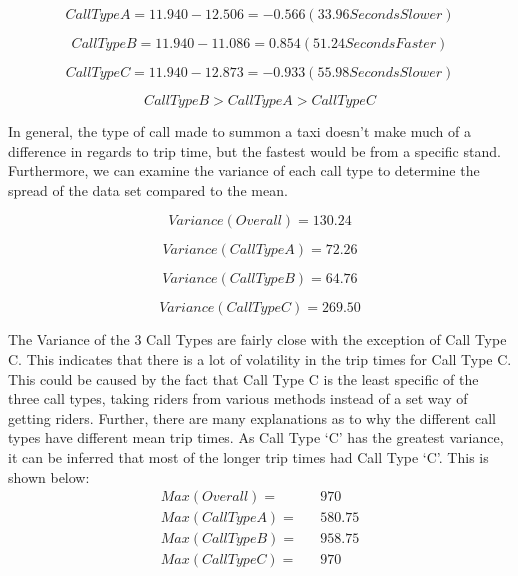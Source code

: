 \documentclass[11pt]{article}
\begin{document}
\begin{equation}
Call Type A = 11.940 - 12.506 = -0.566 (33.96 Seconds Slower)
\end{equation}

\begin{equation}
Call Type B = 11.940 - 11.086 = 0.854(51.24 Seconds Faster)
\end{equation}

\begin{equation}
Call Type C = 11.940 - 12.873 = -0.933 (55.98 Seconds Slower)
\end{equation}

\begin{equation}
Call Type B >Call Type A > Call Type C
\end{equation}

\par
In general, the type of call made to summon a taxi doesn’t make much of a difference in regards to trip time, but the fastest would be from a specific stand. Furthermore, we can examine the variance of each call type to determine the spread of the data set compared to the mean.

\begin{equation}
Variance (Overall) = 130.24
\end{equation}

\begin{equation}
Variance (Call Type A) = 72.26
\end{equation}

\begin{equation}
Variance (Call Type B) = 64.76
\end{equation}

\begin{equation}
Variance (Call Type C) = 269.50
\end{equation}

\par
The Variance of the 3 Call Types are fairly close with the exception of Call Type C. This indicates that there is a lot of volatility in the trip times for Call Type C. This could be caused by the fact that Call Type C is the least specific of the three call types, taking riders from various methods instead of a set way of getting riders. Further, there are many explanations as to why the different call types have different mean trip times. As Call Type ‘C’ has the greatest variance, it can be inferred that most of the longer trip times had Call Type ‘C’. This is shown below:
\begin{equation*}
	\begin{aligned}
		Max(Overall) =&& 970\\
Max(Call Type A) =&& 580.75\\
Max(Call Type B) =&& 958.75\\
Max(Call Type C) =&& 970
	\end{aligned}
\end{equation*}
\end{document}
